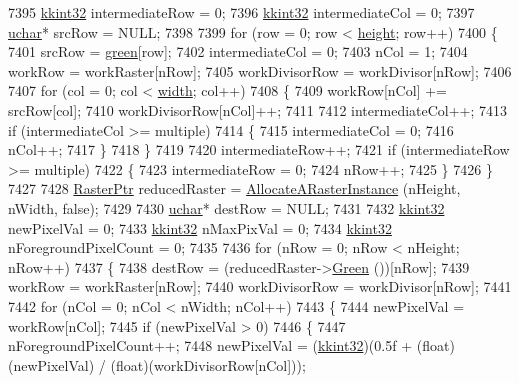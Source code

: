 \begin{DoxyCode}
7395   \hyperlink{namespace_k_k_b_a8fa4952cc84fda1de4bec1fbdd8d5b1b}{kkint32}  intermediateRow = 0;
7396   \hyperlink{namespace_k_k_b_a8fa4952cc84fda1de4bec1fbdd8d5b1b}{kkint32}  intermediateCol = 0;
7397   \hyperlink{namespace_k_k_b_ace9969169bf514f9ee6185186949cdf7}{uchar}*  srcRow = NULL;
7398 
7399   \textcolor{keywordflow}{for}  (row = 0;  row < \hyperlink{class_k_k_b_1_1_raster_af39ff189de4fbb6de98392e187efafb7}{height};  row++)
7400   \{
7401     srcRow = \hyperlink{class_k_k_b_1_1_raster_a2d2238911145488e226cd2e34fc8448c}{green}[row];
7402     intermediateCol = 0;
7403     nCol = 1;
7404     workRow = workRaster[nRow];
7405     workDivisorRow = workDivisor[nRow];
7406 
7407     \textcolor{keywordflow}{for}  (col = 0;  col < \hyperlink{class_k_k_b_1_1_raster_ae0bcc103e191c3421d7692dc69ceb554}{width};  col++)
7408     \{
7409       workRow[nCol] += srcRow[col];
7410       workDivisorRow[nCol]++;
7411 
7412       intermediateCol++;
7413       \textcolor{keywordflow}{if}  (intermediateCol >= multiple)
7414       \{
7415         intermediateCol = 0;
7416         nCol++;
7417       \}
7418     \}
7419 
7420     intermediateRow++;
7421     \textcolor{keywordflow}{if}  (intermediateRow >= multiple)
7422     \{
7423       intermediateRow = 0;
7424       nRow++;
7425     \}
7426   \}
7427 
7428   \hyperlink{class_k_k_b_1_1_raster}{RasterPtr}  reducedRaster = \hyperlink{class_k_k_b_1_1_raster_aa879980d112c01cb7ad9a3cfc7cd6f64}{AllocateARasterInstance} (nHeight, nWidth, \textcolor{keyword}{
      false});
7429 
7430   \hyperlink{namespace_k_k_b_ace9969169bf514f9ee6185186949cdf7}{uchar}*  destRow = NULL;
7431 
7432   \hyperlink{namespace_k_k_b_a8fa4952cc84fda1de4bec1fbdd8d5b1b}{kkint32}  newPixelVal           = 0;
7433   \hyperlink{namespace_k_k_b_a8fa4952cc84fda1de4bec1fbdd8d5b1b}{kkint32}  nMaxPixVal            = 0;
7434   \hyperlink{namespace_k_k_b_a8fa4952cc84fda1de4bec1fbdd8d5b1b}{kkint32}  nForegroundPixelCount = 0;
7435 
7436   \textcolor{keywordflow}{for}  (nRow = 0;  nRow < nHeight;  nRow++)
7437   \{
7438     destRow = (reducedRaster->\hyperlink{class_k_k_b_1_1_raster_a2dbd81f2cb60b3716bcf6467050dde93}{Green} ())[nRow];
7439     workRow = workRaster[nRow];
7440     workDivisorRow = workDivisor[nRow];
7441 
7442     \textcolor{keywordflow}{for}  (nCol = 0;  nCol < nWidth;  nCol++)
7443     \{
7444       newPixelVal = workRow[nCol];
7445       \textcolor{keywordflow}{if}  (newPixelVal > 0)  
7446       \{
7447         nForegroundPixelCount++;
7448         newPixelVal = (\hyperlink{namespace_k_k_b_a8fa4952cc84fda1de4bec1fbdd8d5b1b}{kkint32})(0.5f + (\textcolor{keywordtype}{float})(newPixelVal) / (\textcolor{keywordtype}{float})(workDivisorRow[nCol]));

\end{DoxyCode}
